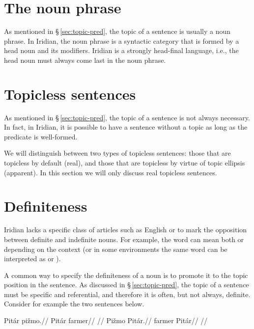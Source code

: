 \section{The noun phrase}

As mentioned in \S\,\ref{sec:topic-pred}, the topic of a sentence is usually a
noun phrase. In Iridian, the noun phrase is a syntactic category that is formed
by a head noun and its modifiers. Iridian is a strongly head-final language,
i.e., the head noun must always come last in the noun phrase.

\section{Topicless sentences}\label{sec:topicless}

As mentioned in \S\,\ref{sec:topic-pred}, the topic of a sentence is not always
necessary. In fact, in Iridian, it is possible to have a sentence without a
topic as long as the predicate is well-formed. 

We will distinguish between two types of topicless sentences: those that are
topicless by default (real), and those that are topicless by virtue of topic
ellipsis (apparent). In this section we will only discuss real topicless
sentences.



\section{Definiteness}\label{sec:definiteness}

Iridian lacks a specific class of articles such as English
 or  to mark the opposition between definite and indefinite
nouns. For example, the word  can mean both  or  depending on the context (or in some environments the same word can be
interpreted as   or ).

A common way to specify the definiteness of a noun is to promote it to the
topic position in the sentence. As discussed in \S\,\ref{sec:topic-pred}, the
topic of a sentence must be specific and referential, and therefore it is often,
but not always, definite. Consider for example the two sentences below.

\begin{multicols}{2}
  \pex
  \a
  \begingl
  \gla Pitár pižmo.//
  \glb Pitár farmer//
  \glft {}//
  \endgl
  \a
  \begingl
  \gla Pižmo Pitár.//
  \glb farmer Pitár//
  \glft {}//
  \endgl
  \xe
\end{multicols}

